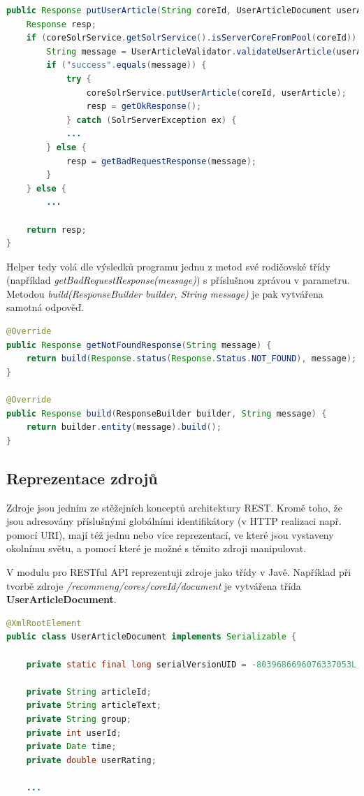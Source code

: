 \documentclass[thesis=M,czech]{FITthesis}[2014/05/07]
\begin{document}
\begin{lstlisting}[language=java]
public Response putUserArticle(String coreId, UserArticleDocument userArticle) {
    Response resp;
    if (coreSolrService.getSolrService().isServerCoreFromPool(coreId)) {
        String message = UserArticleValidator.validateUserArticle(userArticle);
        if ("success".equals(message)) {
            try {
                coreSolrService.putUserArticle(coreId, userArticle);
                resp = getOkResponse();
            } catch (SolrServerException ex) {
			...
        } else {
            resp = getBadRequestResponse(message);
        }
    } else {
        ...

    return resp;
}
\end{lstlisting}

Helper tedy volá dle výsledků programu jednu z metod své rodičovské třídy (například \emph{getBadRequestResponse(message)}) s příslušnou zprávou v parametru. Metodou \emph{build(ResponseBuilder builder, String message)} je pak vytvářena samotná odpověď.

\begin{lstlisting}[language=java]
@Override
public Response getNotFoundResponse(String message) {
    return build(Response.status(Response.Status.NOT_FOUND), message);
}    

@Override
public Response build(ResponseBuilder builder, String message) {
    return builder.entity(message).build();
}
\end{lstlisting}

\subsection{Reprezentace zdrojů}
Zdroje jsou jedním ze stěžejních konceptů architektury REST. Kromě toho, že jsou adresovány příslušnými globálními identifikátory (v HTTP realizaci např. pomocí URI), mají též jednu nebo více reprezentací, ve které jsou vystaveny okolnímu světu, a pomocí které je možné s těmito zdroji manipulovat. 

V modulu pro RESTful API reprezentuji zdroje jako třídy v Javě. Například při tvorbě zdroje \emph{/recommeng/cores/{coreId}/document} je vytvářena třída \textbf{UserArticleDocument}. 

\begin{lstlisting}[language=java]
@XmlRootElement
public class UserArticleDocument implements Serializable {       
    
    private static final long serialVersionUID = -8039686696076337053L;
    
    private String articleId;
    private String articleText;
    private String group;
    private int userId;    
    private Date time;    
    private double userRating;
    
    ...
\end{lstlisting}
\end{document}
